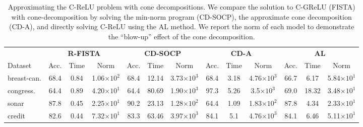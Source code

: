 \setlength{\tabcolsep}{2pt} %

\begin{table}[t]
	\centering
	\caption{Approximating the C-ReLU problem with cone decompositions.
		We compare the solution to C-GReLU (FISTA) with cone-decomposition by solving the min-norm program (CD-SOCP),
		the approximate cone decomposition (CD-A), and directly solving C-ReLU using the AL method.
		We report the norm of each model to demonstrate the ``blow-up'' effect of the cone decomposition.
	}
	\label{table:cone-decomp-full}
	\vspace{0.1in}

	\begin{small}
		\begin{tabular}{lcccccccccccc}
			               & \multicolumn{3}{c}{\textbf{R-FISTA}} & \multicolumn{3}{c}{\textbf{CD-SOCP}} & \multicolumn{3}{c}{\textbf{CD-A}} & \multicolumn{3}{c}{\textbf{AL}}                                                                                                                                        \\ \cmidrule(lr){2-4}  \cmidrule(lr){5-7}  \cmidrule(lr){8-10} \cmidrule(lr){11-13}
			Dataset        & Acc.                                 & Time                                 & Norm                              & Acc.                            & Time   & Norm                          & Acc. & Time & Norm                           & Acc. & Time  & Norm                          \\ \midrule
			breast-can.  & 68.4                                 & 0.84                                 & 1.06{\tiny \(\times 10^{2}\)}     & 68.4                            & 12.14  & 3.73{\tiny \(\times 10^{3}\)} & 68.4 & 3.18 & 4.76{\tiny \(\times 10^{3}\)}  & 66.7 & 6.17  & 5.84{\tiny \(\times 10^{1}\)} \\
			congress.  & 64.4                                 & 0.89                                 & 4.20{\tiny \(\times 10^{1}\)}     & 64.4                            & 80.69  & 1.90{\tiny \(\times 10^{3}\)} & 97.3 & 5.26 & 3.5{\tiny \(\times 10^{3}\)}   & 69.0 & 18.32 & 3.48{\tiny \(\times 10^{1}\)} \\
			sonar          & 87.8                                 & 0.45                                 & 2.25{\tiny \(\times 10^{1}\)}     & 90.2                            & 23.13  & 1.28{\tiny \(\times 10^{2}\)} & 64.4 & 1.09 & 1.83{\tiny \(\times 10^{2}\)}  & 87.8 & 4.34  & 2.33{\tiny \(\times 10^{1}\)} \\
			credit         & 82.6                                 & 0.44                                 & 7.32{\tiny \(\times 10^{1}\)}     & 83.3                            & 63.46  & 3.97{\tiny \(\times 10^{3}\)} & 84.1 & 5.1  & 4.76{\tiny \(\times 10^{3 }\)} & 84.1 & 6.46  & 5.11{\tiny \(\times 10^{1}\)} \\

\end{tabular}
\end{small}
\end{table}
